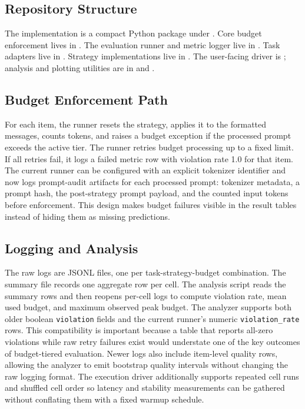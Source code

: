\documentclass[11pt]{article}
\begin{document}
\subsection{Repository Structure}

The implementation is a compact Python package under .
Core budget enforcement lives in .  The evaluation runner
and metric logger live in .  Task adapters live in
.  Strategy implementations live in
.  The user-facing driver is
; analysis and plotting utilities are in
 and .

\subsection{Budget Enforcement Path}

For each item, the runner resets the strategy, applies it to the formatted
messages, counts tokens, and raises a budget exception if the processed prompt
exceeds the active tier.  The runner retries budget processing up to a fixed
limit.  If all retries fail, it logs a failed metric row with violation rate
1.0 for that item.  The current runner can be configured with an explicit
tokenizer identifier and now logs prompt-audit artifacts for each processed
prompt: tokenizer metadata, a prompt hash, the post-strategy prompt payload,
and the counted input tokens before enforcement.  This design makes budget failures visible in the result
tables instead of hiding them as missing predictions.

\subsection{Logging and Analysis}

The raw logs are JSONL files, one per task-strategy-budget combination.  The
summary file records one aggregate row per cell.  The analysis script reads the
summary rows and then reopens per-cell logs to compute violation rate, mean
used budget, and maximum observed peak budget.  The analyzer supports both
older boolean \texttt{violation} fields and the current runner's numeric
\texttt{violation\_rate} rows.  This compatibility is important because a
table that reports all-zero violations while raw retry failures exist would
understate one of the key outcomes of budget-tiered evaluation.  Newer logs
also include item-level quality rows, allowing the analyzer to emit bootstrap
quality intervals without changing the raw logging format.  The execution
driver additionally supports repeated cell runs and shuffled cell order so
latency and stability measurements can be gathered without conflating them
with a fixed warmup schedule.
\end{document}
